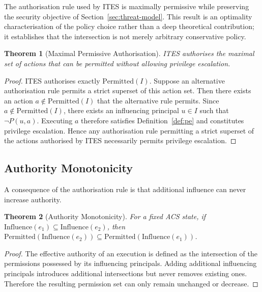 \documentclass{article}
\newtheorem{theorem}{Theorem}
\begin{document}
The authorisation rule used by ITES is maximally permissive while preserving
the security objective of Section~\ref{sec:threat-model}. This result is an
optimality characterisation of the policy choice rather than a deep
theoretical contribution; it establishes that the intersection is not merely
arbitrary conservative policy.

\begin{theorem}[Maximal Permissive Authorisation]
\label{thm:maximal}
ITES authorises the maximal set of actions that can be permitted without
allowing privilege escalation.
\end{theorem}

\begin{proof}
ITES authorises exactly $\mathrm{Permitted}(I)$. Suppose an alternative
authorisation rule permits a strict superset of this action set. Then there
exists an action $a \notin \mathrm{Permitted}(I)$ that the alternative rule
permits. Since $a \notin \mathrm{Permitted}(I)$, there exists an influencing
principal $u \in I$ such that $\neg P(u,a)$. Executing $a$ therefore satisfies
Definition~\ref{def:pe} and constitutes privilege escalation. Hence any
authorisation rule permitting a strict superset of the actions authorised by
ITES necessarily permits privilege escalation.
\end{proof}

\subsection{Authority Monotonicity}

A consequence of the authorisation rule is that additional influence can never
increase authority.

\begin{theorem}[Authority Monotonicity]
\label{thm:monotonicity}
For a fixed ACS state, if $\mathrm{Influence}(e_1) \subseteq
\mathrm{Influence}(e_2)$, then
$\mathrm{Permitted}(\mathrm{Influence}(e_2)) \subseteq
\mathrm{Permitted}(\mathrm{Influence}(e_1))$.
\end{theorem}

\begin{proof}
The effective authority of an execution is defined as the intersection of the
permissions possessed by its influencing principals. Adding additional
influencing principals introduces additional intersections but never removes
existing ones. Therefore the resulting permission set can only remain unchanged
or decrease.
\end{proof}
\end{document}

